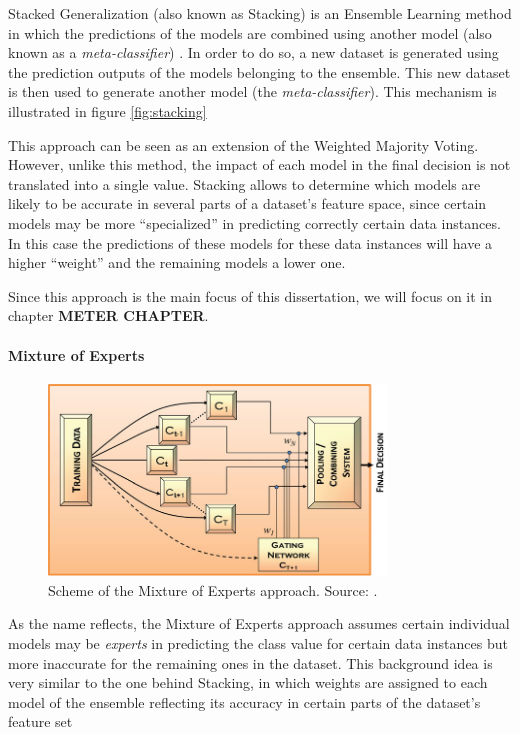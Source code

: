 Stacked Generalization (also known as Stacking) is an Ensemble Learning method in which the predictions of the models are combined using another model (also known as a \textit{meta-classifier}) \cite{Polikar2012a}. In order to do so, a new dataset is generated using the prediction outputs of the models belonging to the ensemble.
This new dataset is then used to generate another model (the \textit{meta-classifier}). This mechanism is illustrated in figure \ref{fig:stacking}

This approach can be seen as an extension of the Weighted Majority Voting.
However, unlike this method, the impact of each model in the final decision is not translated into a single value.
Stacking allows to determine which models are likely to be accurate in several parts of a dataset's feature space, since certain models may be more ``specialized'' in predicting correctly certain data instances.
In this case the predictions of these models for these data instances will have a higher ``weight'' and the remaining models a lower one.

Since this approach is the main focus of this dissertation, we will focus on it in chapter \textbf{METER CHAPTER}.

\paragraph{Mixture of Experts}\mbox{}

\begin{figure}[ht!]
	\centering
	\includegraphics[width=0.8\textwidth]{figures/mixture_models}
	\caption{Scheme of the Mixture of Experts approach. Source: \cite{Polikar2012a}.}
	\label{fig:mixture}
\end{figure}

As the name reflects, the Mixture of Experts approach assumes certain individual models may be \textit{experts} in predicting the class value for certain data instances but more inaccurate for the remaining ones in the dataset. This background idea is very similar to the one behind Stacking, in which weights are assigned to each model of the ensemble reflecting its accuracy in certain parts of the dataset's feature set

